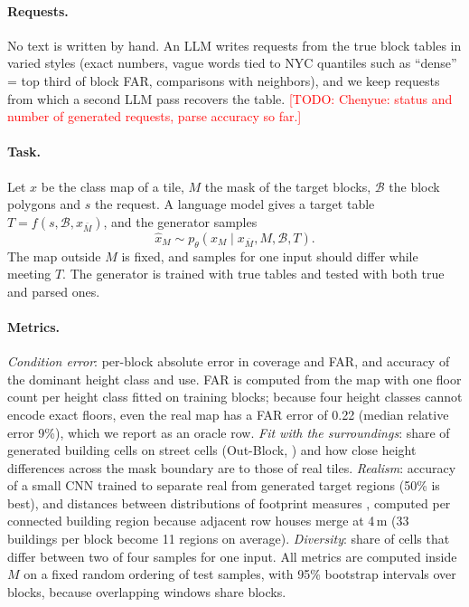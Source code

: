 \documentclass[twocolumn,11pt]{article}
\newcommand{\todo}[1]{\textcolor{red}{[TODO: #1]}}
\begin{document}
\paragraph{Requests.} No text is written by hand. An LLM writes requests from the true block tables in varied styles (exact numbers, vague words tied to NYC quantiles such as ``dense'' = top third of block FAR, comparisons with neighbors), and we keep requests from which a second LLM pass recovers the table. \todo{Chenyue: status and number of generated requests, parse accuracy so far.}

\paragraph{Task.} Let $x$ be the class map of a tile, $M$ the mask of the target blocks, $\mathcal{B}$ the block polygons and $s$ the request. A language model gives a target table $T = f(s, \mathcal{B}, x_{\bar M})$, and the generator samples
\begin{equation}
    \hat{x}_M \sim p_\theta\left(x_M \mid x_{\bar M}, M, \mathcal{B}, T\right).
\end{equation}
The map outside $M$ is fixed, and samples for one input should differ while meeting $T$. The generator is trained with true tables and tested with both true and parsed ones.

\paragraph{Metrics.} \emph{Condition error}: per-block absolute error in coverage and FAR, and accuracy of the dominant height class and use. FAR is computed from the map with one floor count per height class fitted on training blocks; because four height classes cannot encode exact floors, even the real map has a FAR error of 0.22 (median relative error 9\%), which we report as an oracle row. \emph{Fit with the surroundings}: share of generated building cells on street cells (Out-Block, \citealp{he2023globalmapper}) and how close height differences across the mask boundary are to those of real tiles. \emph{Realism}: accuracy of a small CNN trained to separate real from generated target regions (50\% is best), and distances between distributions of footprint measures \citep{fleischmann2019momepy}, computed per connected building region because adjacent row houses merge at 4\,m (33 buildings per block become 11 regions on average). \emph{Diversity}: share of cells that differ between two of four samples for one input. All metrics are computed inside $M$ on a fixed random ordering of test samples, with 95\% bootstrap intervals over blocks, because overlapping windows share blocks.
\end{document}
